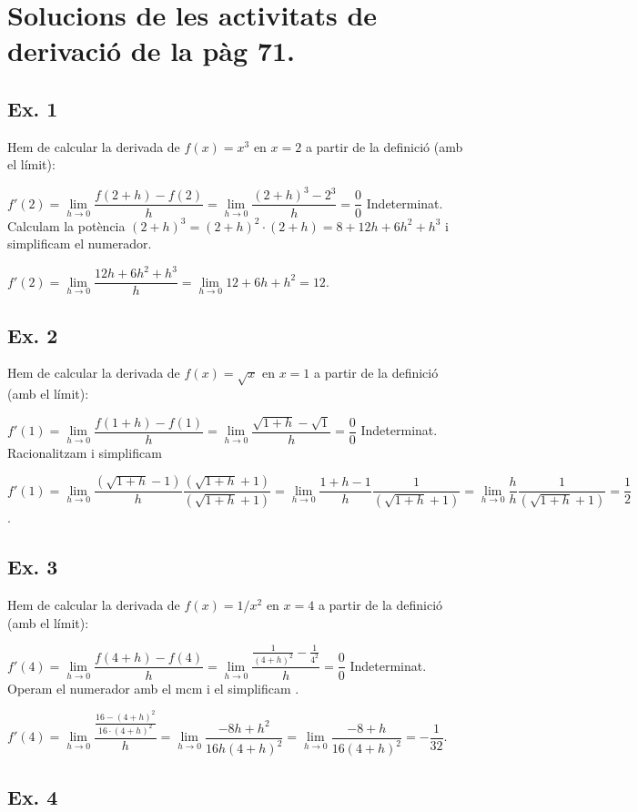 \documentclass[a4paper, 11pt]{book}
\newcommand{\limx}[2][x]{\mathop{lim}\limits_{#1\to #2} }
\begin{document}
	
\section*{Solucions de les activitats de derivació de la pàg 71.}
	
		
	\subsection*{Ex. 1}
	
	Hem de calcular la derivada de $f(x)=x^3$ en $x=2$ a partir de la definició (amb el límit):
	
	$f'(2) = \limx[h]{0} \dfrac{f(2+h)-f(2)}{h}=\limx[h]{0} \dfrac{(2+h)^3-2^3}{h}=\dfrac{0}{0}$ Indeterminat. Calculam la potència $(2+h)^3=(2+h)^2 \cdot (2+h)=8+12h+6h^2+h^3$ i simplificam el numerador.
	
		$f'(2) = \limx[h]{0} \dfrac{12h+6h^2+h^3}{h}=\limx[h]{0} 12+6h+h^2 = 12$.


\subsection*{Ex. 2}

Hem de calcular la derivada de $f(x)=\sqrt{x}$ en $x=1$ a partir de la definició (amb el límit):

$f'(1) = \limx[h]{0} \dfrac{f(1+h)-f(1)}{h}=\limx[h]{0} \dfrac{\sqrt{1+h}-\sqrt{1}}{h}=\dfrac{0}{0}$ Indeterminat. Racionalitzam i simplificam

$f'(1) = \limx[h]{0} \dfrac{(\sqrt{1+h}-1)}{h}\dfrac{(\sqrt{1+h}+1)}{(\sqrt{1+h}+1)}=\limx[h]{0} \dfrac{1+h-1}{h}\dfrac{1}{(\sqrt{1+h}+1)}=\limx[h]{0} \dfrac{h}{h}\dfrac{1}{(\sqrt{1+h}+1)}=\dfrac{1}{2}$.
	
	
	\subsection*{Ex. 3}
	
	Hem de calcular la derivada de $f(x)=1/x^2$ en $x=4$ a partir de la definició (amb el límit):
	
	$f'(4) = \limx[h]{0} \dfrac{f(4+h)-f(4)}{h}=\limx[h]{0} \dfrac{\frac{1}{(4+h)^2} - \frac{1}{4^2}  }{h}=\dfrac{0}{0}$ Indeterminat. Operam el numerador amb el mcm i el simplificam .
	
	$f'(4) = \limx[h]{0} \dfrac{ \frac{16-(4+h)^2}{16\cdot (4+h)^2}}{h} =  \limx[h]{0} \dfrac{-8h+h^2}{16 h (4+h)^2}= \limx[h]{0} \dfrac{-8+h}{16 (4+h)^2}=-\dfrac{1}{32}$.
	
	
	\subsection*{Ex. 4}
	
\end{document}
